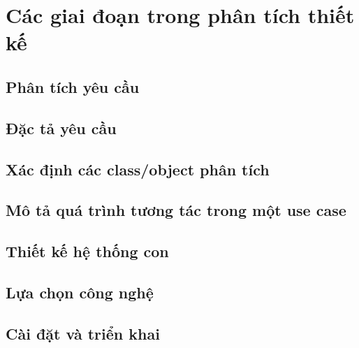 \documentclass{article}
\begin{document}
\section{Các giai đoạn trong phân tích thiết kế}

  \subsection{Phân tích yêu cầu}

  \subsection{Đặc tả yêu cầu}

  \subsection{Xác định các class/object phân tích}

  \subsection{Mô tả quá trình tương tác trong một use case}

  \subsection{Thiết kế hệ thống con}

  \subsection{Lựa chọn công nghệ}

  \subsection{Cài đặt và triển khai}
\end{document}

